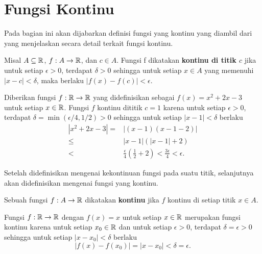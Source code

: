\section{Fungsi Kontinu}
Pada bagian ini akan dijabarkan definisi fungsi yang kontinu yang diambil dari \citep{bartle} yang menjelaskan secara detail terkait fungsi kontinu.
\begin{definisi}
    Misal $A \subseteq \mathbb{R}$, $f:A\to\mathbb{R}$, dan $c \in A$. Fungsi f dikatakan \textbf{kontinu di titik $c$} jika untuk setiap $\epsilon > 0$, terdapat $\delta > 0$ sehingga untuk setiap $x \in A$ yang memenuhi $|x-c| < \delta$, maka berlaku $|f(x) - f(c)| < \epsilon$.
\end{definisi}
\begin{contoh}
    Diberikan fungsi $f:\mathbb{R} \to \mathbb{R}$ yang didefinisikan sebagai $f(x)=x^2+2x-3$ untuk setiap $x\in\mathbb{R}$. Fungsi $f$ kontinu dititik $c=1$ karena untuk setiap $\epsilon>0$, terdapat $\delta=\min(\epsilon/4,1/2)>0$ sehingga untuk setiap $|x-1|<\delta$ berlaku
    \begin{align*}
        |x^2+2x-3|=&|(x-1)(x-1-2)|\\
        \leq&|x-1|(|x-1|+2)\\
        <&\frac{\epsilon}{4}(\frac{1}{2}+2)<\frac{3\epsilon}{4}<\epsilon.
    \end{align*}
\end{contoh}
Setelah didefinisikan mengenai kekontinuan fungsi pada suatu titik, selanjutnya akan didefinisikan mengenai fungsi yang kontinu.
\begin{definisi}
Sebuah fungsi $f:A\to\mathbb{R}$ dikatakan \textbf{kontinu} jika $f$ kontinu di setiap titik $x\in A$.
\end{definisi}
\begin{contoh}
    Fungsi $f:\mathbb{R}\to\mathbb{R}$ dengan $f(x)=x$ untuk setiap $x\in\mathbb{R}$ merupakan fungsi kontinu karena untuk setiap $x_0\in\mathbb{R}$ dan untuk setiap $\epsilon>0$, terdapat \mbox{$\delta=\epsilon>0$} sehingga untuk setiap $|x-x_0|<\delta$ berlaku $$|f(x)-f(x_0)|=|x-x_0|<\delta=\epsilon.$$
\end{contoh}
